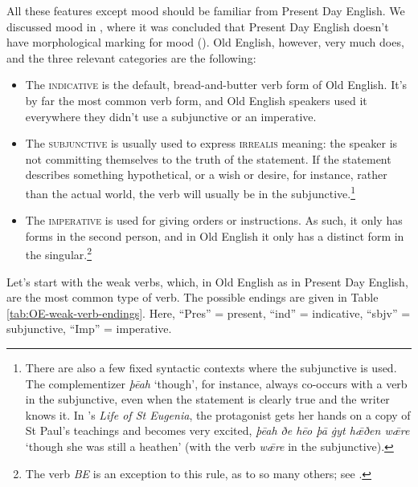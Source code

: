\noindent All these features except mood should be familiar from Present Day English. We discussed mood in , where it was concluded that Present Day English doesn't have morphological marking for mood (). Old English, however, very much does, and the three relevant categories are the following:

\begin{itemize}
    \item The \textsc{indicative} is the default, bread-and-butter verb form of Old English. It's by far the most common verb form, and Old English speakers used it everywhere they didn't use a subjunctive or an imperative.
    \item The \textsc{subjunctive} is usually used to express \textsc{irrealis} meaning: the speaker is not committing themselves to the truth of the statement. If the statement describes something hypothetical, or a wish or desire, for instance, rather than the actual world, the verb will usually be in the subjunctive.\footnote{There are also a few fixed syntactic contexts where the subjunctive is used. The complementizer \emph{þēah} `though', for instance, always co-occurs with a verb in the subjunctive, even when the statement is clearly true and the writer knows it. In 's \emph{Life of St Eugenia}, the protagonist gets her hands on a copy of St Paul's teachings and becomes very excited, \emph{þēah ðe hēo þā ġyt hǣðen wǣre} `though she was still a heathen' (with the verb \emph{wǣre} in the subjunctive).}
    \item The \textsc{imperative} is used for giving orders or instructions. As such, it only has forms in the second person, and in Old English it only has a distinct form in the singular.\footnote{The verb \textit{BE} is an exception to this rule, as to so many others; see .}
\end{itemize}

\noindent Let's start with the weak verbs, which, in Old English as in Present Day English, are the most common type of verb. The possible endings are given in Table \ref{tab:OE-weak-verb-endings}. Here, ``Pres'' = present, ``ind'' = indicative, ``sbjv'' = subjunctive, ``Imp'' = imperative.

